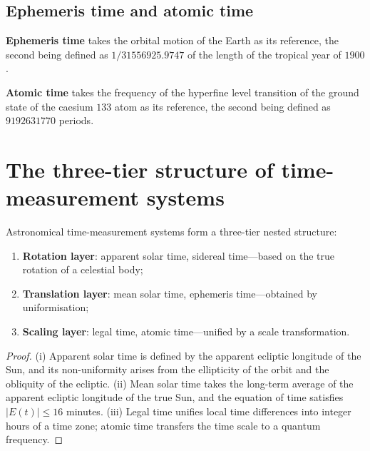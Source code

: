 \subsection{Ephemeris time and atomic time}

\begin{definition}\label{def:ephemeris_time}
\textbf{Ephemeris time} takes the orbital motion of the Earth as its reference, the second being defined as \(1/31556925.9747\) of the length of the tropical year of \(1900\).
\end{definition}

\begin{definition}\label{def:atomic_time}
\textbf{Atomic time} takes the frequency of the hyperfine level transition of the ground state of the caesium \(133\) atom as its reference, the second being defined as \(9192631770\) periods.
\end{definition}

\section{The three-tier structure of time-measurement systems}

\begin{theorem}\label{thm:time_system_grammar_unity}
Astronomical time-measurement systems form a three-tier nested structure:
\begin{enumerate}[label=(\roman*)]
    \item \textbf{Rotation layer}: apparent solar time, sidereal time---based on the true rotation of a celestial body;
    \item \textbf{Translation layer}: mean solar time, ephemeris time---obtained by uniformisation;
    \item \textbf{Scaling layer}: legal time, atomic time---unified by a scale transformation.
\end{enumerate}
\end{theorem}

\begin{proof}
(i) Apparent solar time is defined by the apparent ecliptic longitude of the Sun, and its non-uniformity arises from the ellipticity of the orbit and the obliquity of the ecliptic.
(ii) Mean solar time takes the long-term average of the apparent ecliptic longitude of the true Sun, and the equation of time satisfies \(|E(t)|\le16\) minutes.
(iii) Legal time unifies local time differences into integer hours of a time zone; atomic time transfers the time scale to a quantum frequency.
\end{proof}

